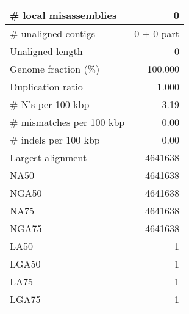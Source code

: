 \documentclass[12pt,a4paper]{article}
\begin{document}
\begin{table}[ht]
\begin{center}
\begin{tabular}{|l*{1}{|r}|}
\# local misassemblies & 0 \\ \hline
\# unaligned contigs & 0 + 0 part \\ \hline
Unaligned length & 0 \\ \hline
Genome fraction (\%) & 100.000 \\ \hline
Duplication ratio & 1.000 \\ \hline
\# N's per 100 kbp & 3.19 \\ \hline
\# mismatches per 100 kbp & 0.00 \\ \hline
\# indels per 100 kbp & 0.00 \\ \hline
Largest alignment & 4641638 \\ \hline
NA50 & 4641638 \\ \hline
NGA50 & 4641638 \\ \hline
NA75 & 4641638 \\ \hline
NGA75 & 4641638 \\ \hline
LA50 & 1 \\ \hline
LGA50 & 1 \\ \hline
LA75 & 1 \\ \hline
LGA75 & 1 \\ \hline
\end{tabular}
\end{center}
\end{table}
\end{document}
